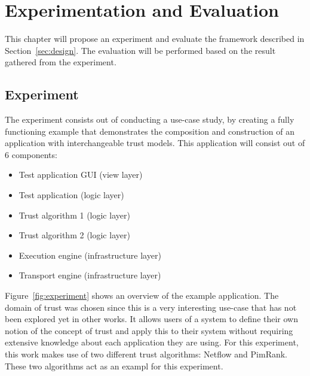 \chapter{\label{sec:experimentation-and-evaluation}Experimentation and Evaluation}


This chapter will propose an experiment and evaluate the framework described in Section~\ref{sec:design}. The evaluation will be performed based on the result gathered from the experiment.

\section{Experiment}

The experiment consists out of conducting a use-case study, by creating a fully functioning example that demonstrates the composition and construction of an application with interchangeable trust models. This application will consist out of 6 components:

\begin{itemize}
	\item Test application GUI (view layer)
	\item Test application (logic layer)
	\item Trust algorithm 1 (logic layer)
	\item Trust algorithm 2 (logic layer)
	\item Execution engine (infrastructure layer)
	\item Transport engine (infrastructure layer)
\end{itemize}

Figure~\ref{fig:experiment} shows an overview of the example application. The domain of trust was chosen since this is a very interesting use-case that has not been explored yet in other works. It allows users of a system to define their own notion of the concept of trust and apply this to their system without requiring extensive knowledge about each application they are using. For this experiment, this work makes use of two different trust algorithms: Netflow and PimRank. These two algorithms act as an exampl for this experiment.

